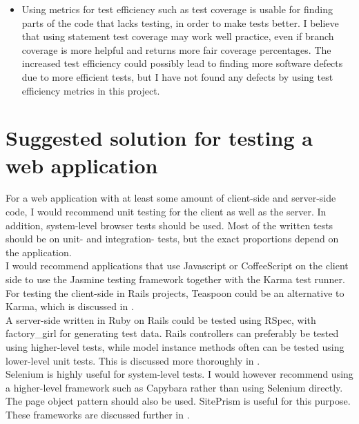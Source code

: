 \begin{itemize}
\item Using metrics for test efficiency such as test coverage is usable
for finding parts of the code that lacks testing, in order to make tests
better. I believe that using statement test coverage may work well
practice, even if branch coverage is more helpful and returns more fair
coverage percentages. The increased test efficiency could possibly lead
to finding more software defects due to more efficient tests, but I have
not found any defects by using test efficiency metrics in this
project.\\

\end{itemize}

\newpage
\section{Suggested solution for testing a web application}

For a web application with at least some amount of client-side and
server-side code, I would recommend unit testing for the client as well
as the server. In addition, system-level browser tests should be used.
Most of the written tests should be on unit- and integration-
tests, but the exact proportions depend on the application.\\

I would recommend applications that use Javascript or CoffeeScript on
the client side to use the Jasmine testing framework together with the
Karma test runner. For testing the client-side in Rails projects,
Teaspoon could be an alternative to Karma, which is discussed in
.\\

A server-side written in Ruby on Rails could be tested using RSpec, with
factory\_girl for generating test data. Rails controllers can preferably
be tested using higher-level tests, while model instance methods often
can be tested using lower-level unit tests. This is discussed more
thoroughly in .\\

Selenium is highly useful for system-level tests. I would however
recommend using a higher-level framework such as Capybara rather than
using Selenium directly. The page object pattern should also be used.
SitePrism is useful for this purpose. These frameworks are discussed
further in .\\
